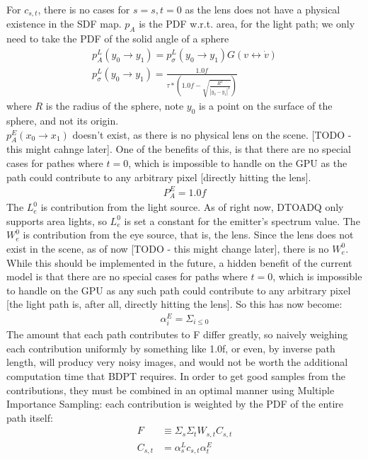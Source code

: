 \documentclass{article}
\begin{document}
    For $c_{s, t}$, there is no cases for $s = s, t = 0$ as
    the lens does not have a physical existence in the SDF map. $p_A$ is
    the PDF w.r.t. area, for the light path; we only need to take the PDF of the
    solid angle of a sphere
  \begin{align}
    p_A^L(y_0 \rightarrow y_1) = p_{\sigma}^L(y_0 \rightarrow y_1) G(v
    \leftrightarrow \dot{v})\\
    p_{\sigma}^L(y_0 \rightarrow y_1) = \frac{1.0f}{\tau * (1.0f -
    \sqrt{\frac{R^2}{|y_0 - y_1|^2}})}
  \end{align}
    where $R$ is the radius of the sphere, note $y_0$ is a point on the surface
    of the sphere, and not its origin.
    \\$p_A^E(x_0 \rightarrow x_1)$ doesn't exist, as there is no physical lens
    on the scene. [TODO - this might cahnge later]. One of the benefits of this,
    is that there are no special cases for pathes where $t = 0$, which is
    impossible to handle on the GPU as the path could contribute to any
    arbitrary pixel [directly hitting the lens].
  \begin{align}
    P_A^E = 1.0f
  \end{align}
    The $L^0_e$ is contribution from the light source. As of right now, DTOADQ
    only supports area lights, so $L^0_e$ is set a constant for the emitter's
    spectrum value.
    The $W_e^0$ is contribution from the eye source, that is, the lens. Since
    the lens does not exist in the scene, as of now [TODO - this might change
    later], there is no $W_e^0$. While this should be implemented in the future,
    a hidden benefit of the current model is that there are no special cases for
    paths where $t = 0$, which is impossible to handle on the GPU as any such
    path could contribute to any arbitrary pixel [the light path is, after all,
    directly hitting the lens]. So this has now become:
  \begin{align}
    \alpha_i^E = \Sigma_{i\leq 0} 
  \end{align}
  The amount that each path contributes to F differ greatly, so naively
  weighing each contribution uniformly by something like 1.0f, or even, by
  inverse path length, will producy very noisy images, and would not be
  worth the additional computation time that BDPT requires. In order to get good
  samples from the contributions, they must be combined in an optimal manner
  using Multiple Importance Sampling: each contribution is weighted by the PDF
  of the entire path itself:
  \begin{align*}
    F &\equiv \Sigma_s\Sigma_tW_{s, t}C_{s, t}\\
    C_{s, t} &= \alpha^L_s c_{s, t} \alpha^E_t
  \end{align*}
\end{document}
